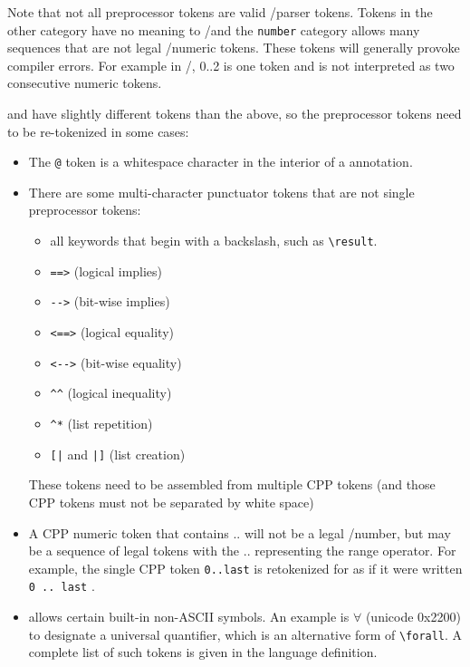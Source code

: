 Note that not all preprocessor tokens are valid \C/\cpp parser tokens. Tokens in the other category have no meaning to \C/\cpp and the \texttt{number} category allows many sequences that are not legal \C/\cpp numeric tokens. These tokens will generally provoke compiler errors. For example in \C/\cpp, 0..2 is one token and is not interpreted as two consecutive numeric tokens.

\acsl and \acslpp have slightly different tokens than the above, so the preprocessor tokens need to be re-tokenized in some cases:
\begin{itemize}
	\item The \verb|@| token is a whitespace character in the interior of a \acslb annotation.
	\item There are some \acslb multi-character punctuator tokens that are not
	single preprocessor tokens:
	\begin{itemize}
        		\item all \acslb keywords that begin with a backslash, such as \verb|\result|.
		\item \verb|==>| (logical implies)
		\item \verb|-->| (bit-wise implies)
		\item \verb|<==>| (logical equality)
		\item \verb|<-->| (bit-wise equality)
		\item \verb|^^| (logical inequality)
		\item \verb|^*| (list repetition)
		\item \verb:[|: and \verb:|]: (list creation)
	\end{itemize}
	These \acslb tokens need to be assembled from multiple CPP tokens (and those CPP tokens must not be separated by white space)
	\item A CPP numeric token that contains .. will not be a legal \C/\cpp number, but may be a sequence of
 legal \acslb tokens with the .. representing the range operator.  For example, the single CPP token \texttt{0..last} is retokenized for \acslb as if it were written \texttt{0 .. last} .
	\item \acslb allows certain built-in non-ASCII symbols.
    An example is 
		$\forall$ (unicode 0x2200) to designate a universal quantifier,
    which is an alternative form of \verb|\forall|.
    A complete list of such tokens is given  in the \acslb language definition.
\end{itemize}

